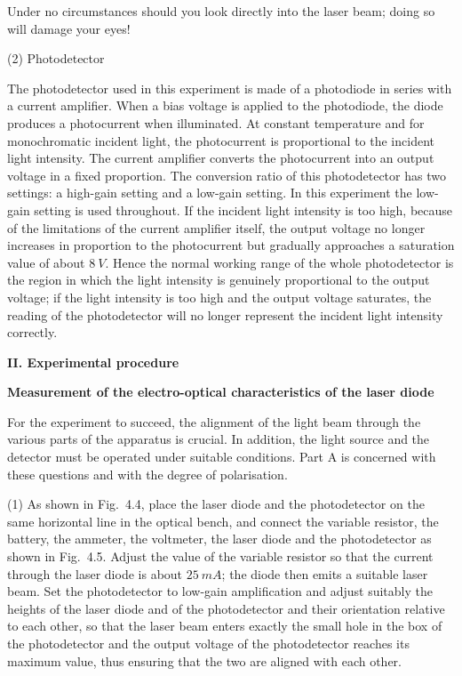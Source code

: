 \begin{note}
Under no circumstances should you look directly into the laser beam; doing so will damage your eyes!
\end{note}

(2) Photodetector

The photodetector used in this experiment is made of a photodiode in series with a current amplifier. When a bias voltage is applied to the photodiode, the diode produces a photocurrent when illuminated. At constant temperature and for monochromatic incident light, the photocurrent is proportional to the incident light intensity. The current amplifier converts the photocurrent into an output voltage in a fixed proportion. The conversion ratio of this photodetector has two settings: a high-gain setting and a low-gain setting. In this experiment the low-gain setting is used throughout. If the incident light intensity is too high, because of the limitations of the current amplifier itself, the output voltage no longer increases in proportion to the photocurrent but gradually approaches a saturation value of about $\SI{8}{V}$. Hence the normal working range of the whole photodetector is the region in which the light intensity is genuinely proportional to the output voltage; if the light intensity is too high and the output voltage saturates, the reading of the photodetector will no longer represent the incident light intensity correctly.

\noindent\textbf{II. Experimental procedure}

\noindent\textbf{Measurement of the electro-optical characteristics of the laser diode}

For the experiment to succeed, the alignment of the light beam through the various parts of the apparatus is crucial. In addition, the light source and the detector must be operated under suitable conditions. Part A is concerned with these questions and with the degree of polarisation.

(1) As shown in Fig.~4.4, place the laser diode and the photodetector on the same horizontal line in the optical bench, and connect the variable resistor, the battery, the ammeter, the voltmeter, the laser diode and the photodetector as shown in Fig.~4.5. Adjust the value of the variable resistor so that the current through the laser diode is about $\SI{25}{mA}$; the diode then emits a suitable laser beam. Set the photodetector to low-gain amplification and adjust suitably the heights of the laser diode and of the photodetector and their orientation relative to each other, so that the laser beam enters exactly the small hole in the box of the photodetector and the output voltage of the photodetector reaches its maximum value, thus ensuring that the two are aligned with each other.

